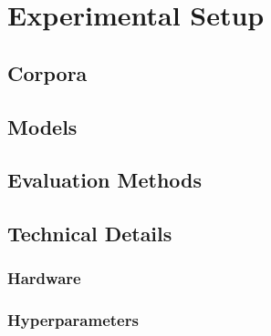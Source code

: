 \chapter{Experimental Setup}
\label{ch:Experiments}

\section{Corpora}
\label{sec:Experiments:Corpora}

\section{Models}
\label{sec:Experiments:Models}

\section{Evaluation Methods}
\label{sec:Experiments:Evaluation}

\section{Technical Details}
\label{sec:Experiments:Technical}

\subsection{Hardware}

\subsection{Hyperparameters}